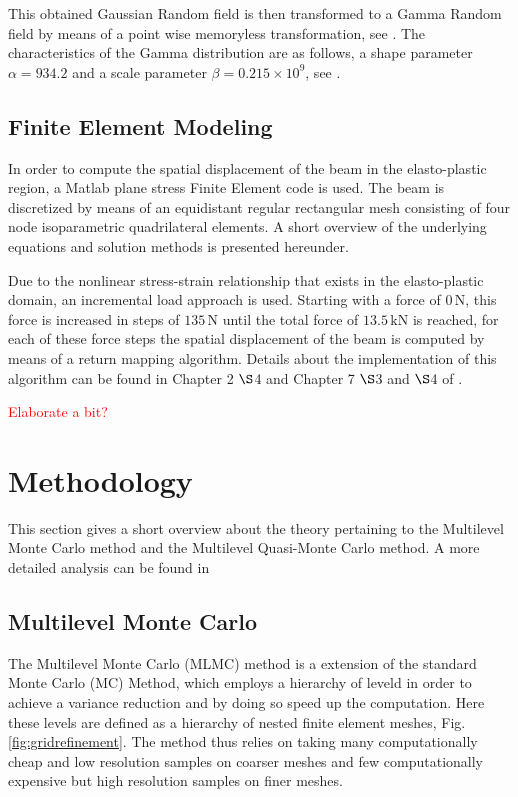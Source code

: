 \documentclass{ICASP13Paper}
\begin{document}
This obtained Gaussian Random field is then transformed to a Gamma Random field by means of a point wise memoryless transformation, see \cite{Grigoriu}. The characteristics of the Gamma distribution are as follows, a shape parameter $\alpha = 934.2$ and a scale parameter $\beta = 0.215 \times 10^{9}$, see \cite{Hess}.

\subsection{Finite Element Modeling}
In order to compute the spatial displacement of the beam in the elasto-plastic region, a Matlab plane stress Finite Element code is used. The beam is discretized by means of an equidistant regular rectangular mesh consisting of four node isoparametric quadrilateral elements. A short overview of the underlying equations and solution methods is presented hereunder.

Due to the nonlinear stress-strain relationship that exists in the elasto-plastic domain, an incremental load approach is used. Starting with a force of $0\,\mathrm{N}$, this force is increased in steps of $135\,\mathrm{N}$ until the total force of $13.5\,\mathrm{kN}$ is reached, for each of these force steps the spatial displacement of the beam is computed by means of a return mapping algorithm. Details about the implementation of this  algorithm can be found in Chapter 2 $\S$4 and Chapter 7 $\S$3 and $\S$4 of \cite{Borst}.

\textcolor{red}{Elaborate a bit?}

\section{Methodology}
This section gives a short overview about the theory pertaining to the Multilevel Monte Carlo method and the Multilevel Quasi-Monte Carlo method. A more detailed analysis can be found in \cite{Giles,Giles2}
\subsection{Multilevel Monte Carlo}
The Multilevel Monte Carlo (MLMC) method is a extension of the standard Monte Carlo (MC) Method, which employs a hierarchy of leveld in order to achieve a variance reduction and by doing so speed up the computation. Here these levels are defined as a hierarchy of nested finite element meshes, Fig.\,\ref{fig:gridrefinement}. The method thus relies on taking many computationally cheap and low resolution samples on coarser meshes and few computationally expensive but high resolution samples on finer meshes.
\end{document}
